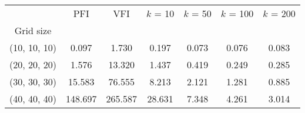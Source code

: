 \begin{tabular}{ccccccc}
\toprule
{} &      PFI &      VFI &  $k$ = 10 &  $k$ = 50 &  $k$ = 100 &  $k$ = 200 \\
Grid size    &          &          &           &           &            &            \\
\midrule
(10, 10, 10) &    0.097 &    1.730 &     0.197 &     0.073 &      0.076 &      0.083 \\
(20, 20, 20) &    1.576 &   13.320 &     1.437 &     0.419 &      0.249 &      0.285 \\
(30, 30, 30) &   15.583 &   76.555 &     8.213 &     2.121 &      1.281 &      0.885 \\
(40, 40, 40) &  148.697 &  265.587 &    28.631 &     7.348 &      4.261 &      3.014 \\
\bottomrule
\end{tabular}
